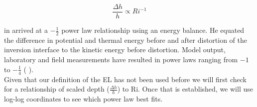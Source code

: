 \begin{equation}
\frac{\Delta h}{h} \propto Ri^{-1}
\end{equation}

\citeauthor{Boers89} in \cite{Boers89} arrived at a $-\frac{1}{2}$ power law relationship using an energy balance.  He equated the difference in potential and thermal energy before and after distortion of the inversion interface to the kinetic energy before distortion. Model output, laboratory and field measurements have resulted in power laws ranging from  $-1$ to $-\frac{1}{4}$ (\citeauthor{Traum11} \cite{Traum11}).\\

Given that our definition of the \acs{EL} has not been used before we will first check for a relationship of scaled depth ($\frac{\Delta h}{h}$) to \acs{Ri}.  Once that is established, we will use log-log coordinates to see which power law best fits.\\

\endinput

Any text after an \endinput is ignored.
You could put scraps here or things in progress.



